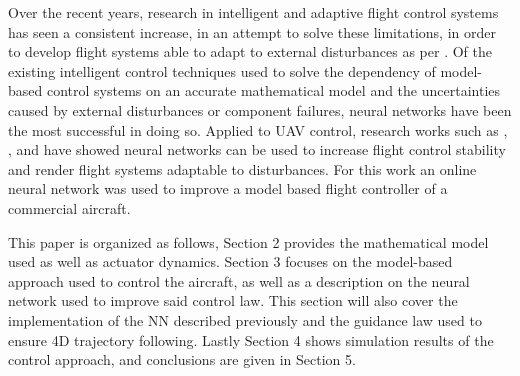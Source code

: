 Over the recent years, research in intelligent and adaptive flight control systems has seen a consistent increase, in an attempt to solve these limitations, in order to develop flight systems able to adapt to external disturbances as per \cite{SotA_IFCS}. Of the existing intelligent control techniques used to solve the dependency of model-based control systems on an accurate mathematical model and the uncertainties caused by external disturbances or component failures, neural networks have been the most successful in doing so. Applied to UAV control, research works such as \cite{online_adaptiveNN}, \cite{UAV_adaptive}, \cite{UAV_adaptive2} and \cite{YANG+LIN_Adaptive_Flight_Control} have showed neural networks can be used to increase flight control stability and render flight systems adaptable to disturbances. For this work an online neural network was used to improve a model based flight controller of a commercial aircraft. 

This paper is organized as follows, Section 2  provides the mathematical model used as well as actuator dynamics. Section 3 focuses on the model-based approach used to control the aircraft, as well as a description on the neural network used to improve said control law. This section will also cover the implementation of the NN described previously and the guidance law used to ensure 4D trajectory following. Lastly Section 4 shows simulation results of the control approach, and conclusions are given in Section 5.